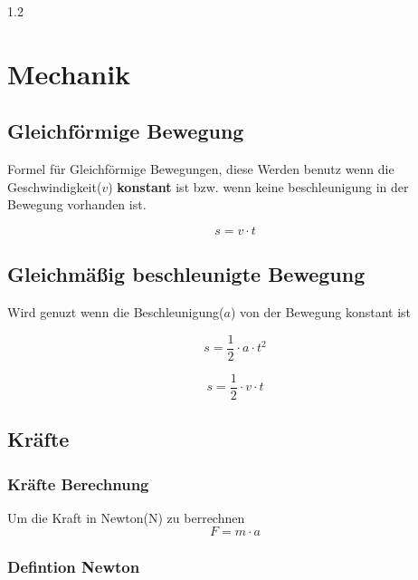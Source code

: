 \documentclass{article}
\newcommand{\Zeilenabstand}{1.2}
\begin{document}
\begin{spacing}{\Zeilenabstand}
        \section{Mechanik}
            \subsection{Gleichförmige Bewegung}  
                Formel für Gleichförmige Bewegungen, diese Werden benutz wenn die Geschwindigkeit(\(v\)) \textbf{konstant} ist bzw. 
                wenn keine beschleunigung in der Bewegung vorhanden ist.  

                \begin{equation}
                    s=v\cdot t
                \end{equation}

            \subsection{Gleichmäßig beschleunigte Bewegung}
                Wird genuzt wenn die Beschleunigung(\(a\)) von der Bewegung konstant ist 

                \begin{equation}
                    s=\frac{1}{2}\cdot a \cdot t^2
                \end{equation}

                \begin{equation}
                    s=\frac{1}{2}\cdot v \cdot t 
                \end{equation}

            \subsection{Kräfte}

            \subsubsection{Kräfte Berechnung}

            Um die Kraft in Newton(N) zu berrechnen
            \begin{equation}
                F=m\cdot a
            \end{equation}

            \subsubsection{Defintion Newton}


\end{spacing}
\end{document}
